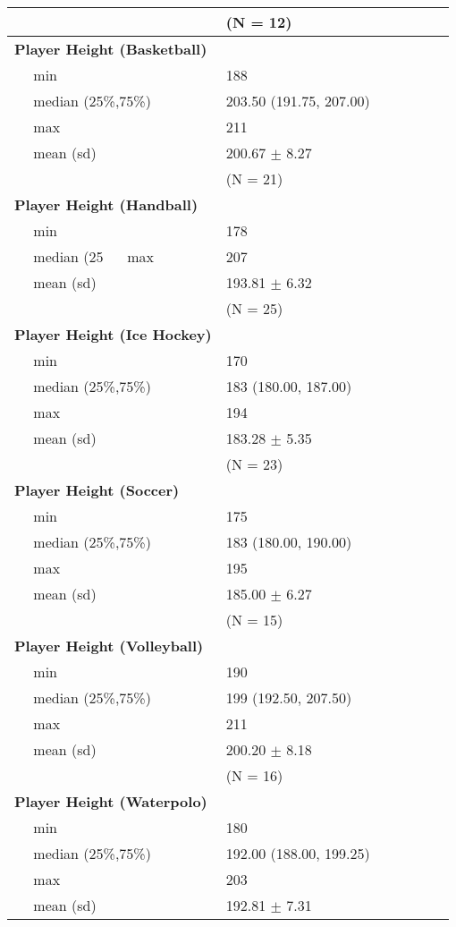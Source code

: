 \begin{tabular}{l|l|l|l|l|l|l}
\begin{tabular}{l|l}
\hline
 &  (N = 12)\\
\hline
\bf{Player Height (Basketball)} & ~\\
\hline
~~ min & 188\\
\hline
~~ median (25\%,75\%) & 203.50 (191.75, 207.00)\\
\hline
~~ max & 211\\
\hline
~~ mean (sd) & 200.67 $\pm$ 8.27\\
\hline

\hline
 &  (N = 21)\\
\hline
\bf{Player Height (Handball)} & ~\\
\hline
~~ min & 178\\
\hline
~~ median (25%
\hline
~~ max & 207\\
\hline
~~ mean (sd) & 193.81 $\pm$ 6.32\\
\hline

\hline
 &  (N = 25)\\
\hline
\bf{Player Height (Ice Hockey)} & ~\\
\hline
~~ min & 170\\
\hline
~~ median (25\%,75\%) & 183 (180.00, 187.00)\\
\hline
~~ max & 194\\
\hline
~~ mean (sd) & 183.28 $\pm$ 5.35\\
\hline

\hline
 &  (N = 23)\\
\hline
\bf{Player Height (Soccer)} & ~\\
\hline
~~ min & 175\\
\hline
~~ median (25\%,75\%) & 183 (180.00, 190.00)\\
\hline
~~ max & 195\\
\hline
~~ mean (sd) & 185.00 $\pm$ 6.27\\
\hline

\hline
 & (N = 15)\\
\hline
\bf{Player Height (Volleyball)} & ~\\
\hline
~~ min & 190\\
\hline
~~ median (25\%,75\%) & 199 (192.50, 207.50)\\
\hline
~~ max & 211\\
\hline
~~ mean (sd) & 200.20 $\pm$ 8.18\\
\hline

\hline
 &  (N = 16)\\
\hline
\bf{Player Height (Waterpolo)} & ~\\
\hline
~~ min & 180\\
\hline
~~ median (25\%,75\%) & 192.00 (188.00, 199.25)\\
\hline
~~ max & 203\\
\hline
~~ mean (sd) & 192.81 $\pm$ 7.31\\
\hline
\end{tabular}

